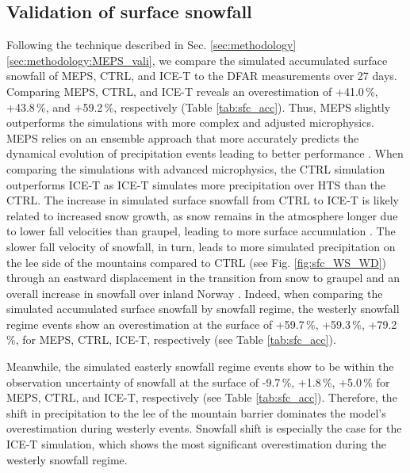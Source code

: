 \documentclass{ametsocV5}
\begin{document}
	\subsection{Validation of surface snowfall}\label{sec:res:season_sfc}
		Following the technique described in Sec. \ref{sec:methodology}\ref{sec:methodology:MEPS_vali}, we compare the simulated accumulated surface snowfall of MEPS, CTRL, and ICE-T to the DFAR measurements over 27 days. Comparing MEPS, CTRL, and ICE-T reveals an overestimation of +41.0\,\%, +43.8\,\%, and +59.2\,\%, respectively (Table \ref{tab:sfc_acc}). Thus, MEPS slightly outperforms the simulations with more complex and adjusted microphysics. MEPS relies on an ensemble approach that more accurately predicts the dynamical evolution of precipitation events leading to better performance \citep{frogner_convection-permitting_2019}. When comparing the simulations with advanced microphysics, the CTRL simulation outperforms ICE-T as ICE-T simulates more precipitation over HTS than the CTRL. 
		The increase in simulated surface snowfall from CTRL to ICE-T is likely related to increased snow growth, as snow remains in the atmosphere longer due to lower fall velocities than graupel, leading to more surface accumulation \citep{engdahl_effects_2020}. 
		The slower fall velocity of snowfall, in turn, leads to more simulated precipitation on the lee side of the mountains compared to CTRL (see Fig. \ref{fig:sfc_WS_WD}) through an eastward displacement in the transition from snow to graupel and an overall increase in snowfall over inland Norway \citep{engdahl_effects_2020}. Indeed, when comparing the simulated accumulated surface snowfall by snowfall regime, the westerly snowfall regime events show an overestimation at the surface of +59.7\,\%, +59.3\,\%, +79.2\,\%, for MEPS, CTRL, ICE-T, respectively (see Table \ref{tab:sfc_acc}). 
		
		Meanwhile, the simulated easterly snowfall regime events show to be within the observation uncertainty of snowfall at the surface of -9.7\,\%, +1.8\,\%, +5.0\,\% for MEPS, CTRL, and ICE-T, respectively (see Table \ref{tab:sfc_acc}). Therefore, the shift in precipitation to the lee of the mountain barrier dominates the model's overestimation during westerly events. Snowfall shift is especially the case for the ICE-T simulation, which shows the most significant overestimation during the westerly snowfall regime. 
\end{document}
